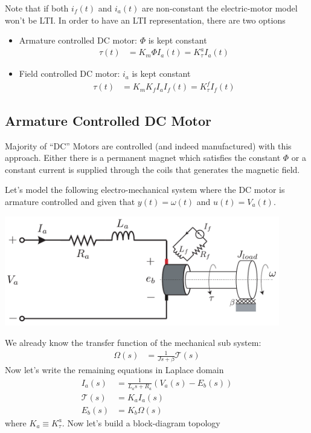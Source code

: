\documentclass[twoside]{article}
\begin{document}
\vspace{12pt}
%
Note that if both $i_f(t)$ and $i_a(t)$ are non-constant the electric-motor model 
won't be LTI. In order to have an LTI representation, there are two options
%
\begin{itemize}
	\item Armature controlled DC motor: $\Phi$ is kept constant 
	\begin{align*}
		\tau(t) &= K_m \Phi I_a(t) = K_{\tau}^a I_a(t)
	\end{align*}
	\item Field controlled DC motor: $i_a$ is kept constant 
	\begin{align*}
		\tau(t) &= K_m K_f I_a I_f(t) = K_{\tau}^f I_f(t)
	\end{align*}
\end{itemize}

\subsection{Armature Controlled DC Motor}

Majority of ``DC'' Motors are controlled (and indeed manufactured) with this approach. Either
there is a permanent magnet which satisfies the constant $\Phi$ or a constant current is supplied
through the coils that generates the magnetic field.

Let's model the following electro-mechanical system where the DC motor is armature controlled 
and given that $y(t) = \omega(t)$ and $u(t) = V_a(t)$.

  \begin{minipage}[h]{1\linewidth}
    \begin{center}
      \includegraphics[width=0.9\textwidth]{Armature_DC_Motor}
    \end{center}
  \end{minipage} 
 
 We already know the transfer function of the mechanical sub system:
\begin{align*}
	\Omega(s) &= \frac{1}{J s + \beta} \mathcal{T}(s)
\end{align*}
 Now let's write the remaining equations in Laplace domain
 \begin{align*}
	I_a(s) &= \frac{1}{L_a s + R_a} \left( V_a(s) - E_b(s) \right)
	\\
	\mathcal{T}(s) &= K_a I_a(s)
	\\
	E_b(s) &= K_b \Omega(s)
\end{align*}
%
where $K_a \equiv K_{\tau}^a$. Now let's build a block-diagram topology
\end{document}
